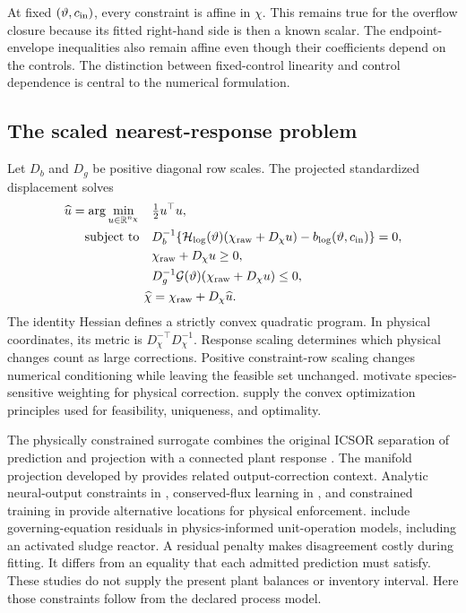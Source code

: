 At fixed $(\vartheta,c_{\rm in})$, every constraint is affine in $\chi$. This remains true for the overflow closure because its fitted right-hand side is then a known scalar. The endpoint-envelope inequalities also remain affine even though their coefficients depend on the controls. The distinction between fixed-control linearity and control dependence is central to the numerical formulation.

\subsection{The scaled nearest-response problem}

Let $D_b$ and $D_g$ be positive diagonal row scales. The projected standardized displacement solves
\begin{align}
\widehat u=\arg\min_{u\in\mathbb R^{n_\chi}}\quad&\tfrac12u^\top u,\\
\text{subject to}\quad&
D_b^{-1}\{\mathcal H_{\log}(\vartheta)(\chi_{\rm raw}+D_\chi u)
-b_{\log}(\vartheta,c_{\rm in})\}=0,\notag\\
&\chi_{\rm raw}+D_\chi u\ge0,\notag\\
&D_g^{-1}\mathcal G(\vartheta)(\chi_{\rm raw}+D_\chi u)\le0,\notag\\
\widehat\chi&=\chi_{\rm raw}+D_\chi\widehat u.
\label{eq:plant_joint_projection}
\end{align}
The identity Hessian defines a strictly convex quadratic program. In physical coordinates, its metric is $D_\chi^{-\top}D_\chi^{-1}$. Response scaling determines which physical changes count as large corrections. Positive constraint-row scaling changes numerical conditioning while leaving the feasible set unchanged. \citet{SturmSilva2024} motivate species-sensitive weighting for physical correction. \citet{Boyd2004} supply the convex optimization principles used for feasibility, uniqueness, and optimality.

The physically constrained surrogate combines the original ICSOR separation of prediction and projection with a connected plant response \citep{Selerio2026}. The manifold projection developed by \citet{Valente2025} provides related output-correction context. Analytic neural-output constraints in \citet{Beucler2021}, conserved-flux learning in \citet{SturmWexler2020}, and constrained training in \citet{Ruckstuhl2021} provide alternative locations for physical enforcement. \citet{Li2024} include governing-equation residuals in physics-informed unit-operation models, including an activated sludge reactor. A residual penalty makes disagreement costly during fitting. It differs from an equality that each admitted prediction must satisfy. These studies do not supply the present plant balances or inventory interval. Here those constraints follow from the declared process model.

